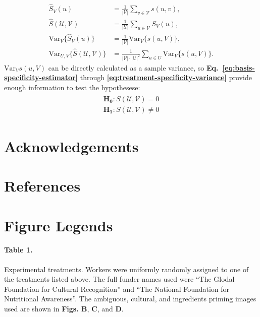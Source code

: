 \documentclass[a4paper]{report}
\begin{document}
\begin{align}
	\hat{S}_V(u) &= \frac{1}{|\mathcal{V}|} \sum_{v \in \mathcal{V}} s(u,v), 
		\label{eq:basis-specificity-estimator} \\
		\hat{S}(\mathcal{U},\mathcal{V}) 
			&= \frac{1}{|\mathcal{U}|} \sum_{u \in \mathcal{V}} S_V(u),
		\label{eq:treatment-specificity-estimator} \\
		\text{Var}_V\{\hat{S}_V(u)\} 
			&= \frac{1}{|\mathcal{V}|}\text{Var}_V\{s(u,V)\},
		\label{eq:basis-specificity-variance} \\
		\text{Var}_{U,V}\{\hat{S}(\mathcal{U},\mathcal{V})\} 
			&= \frac{1}{|\mathcal{V}|\cdot|\mathcal{U}|^2} 
			\sum_{u\in U}\text{Var}_V\{{s}(u,V)\}.
		\label{eq:treatment-specificity-variance}
\end{align}
$\text{Var}_V{s(u,V)}$ can be directly calculated as a sample variance, so
\textbf{Eq.~\ref{eq:basis-specificity-estimator}} through \textbf{\ref{eq:treatment-specificity-variance}} provide enough information to test the hypothesese:
\begin{align}
	\begin{matrix}
		\mathbf{H_0}: S(\mathcal{U}, \mathcal{V}) = 0 \\[0.5em]
		\mathbf{H_1}: S(\mathcal{U}, \mathcal{V}) \neq 0
	\end{matrix}
\end{align}

\section*{Acknowledgements}
\section*{References}
\begingroup
\renewcommand{\chapter}[2]{}

\endgroup
 

\section*{Figure Legends}

\paragraph{Table 1.}
	Experimental treatments.  Workers were uniformly randomly
	assigned to one of the treatments listed above.  The full funder 
	names used were ``The Glodal Foundation
	for Cultural Recognition'' and ``The National Foundation for 
	Nutritional Awareness''.  The ambiguous, cultural, and ingredients 
	priming images used are shown in \textbf{Figs. B}, \textbf{C}, and 
	\textbf{D}.
\end{document}
